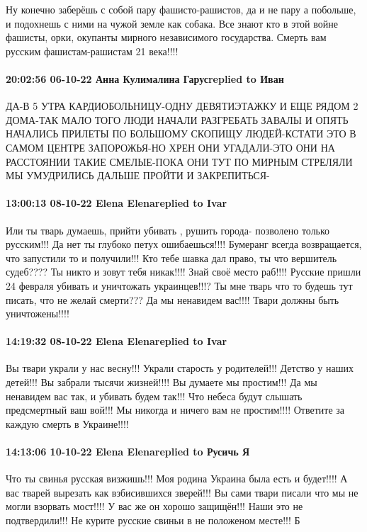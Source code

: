 Ну конечно заберёшь с собой пару фашисто-рашистов, да и не пару а побольше, и
подохнешь с ними на чужой земле как собака. Все знают кто в этой войне фашисты,
орки, окупанты мирного независимого государства. Смерть вам русским
фашистам-рашистам 21 века!!!!

\paragraph{20:02:56 06-10-22 Анна Кулималина Гарусreplied to Иван}

ДА-В 5 УТРА КАРДИОБОЛЬНИЦУ-ОДНУ ДЕВЯТИЭТАЖКУ И ЕЩЕ РЯДОМ 2 ДОМА-ТАК МАЛО ТОГО
ЛЮДИ НАЧАЛИ РАЗГРЕБАТЬ ЗАВАЛЫ И ОПЯТЬ НАЧАЛИСЬ ПРИЛЕТЫ ПО БОЛЬШОМУ СКОПИЩУ
ЛЮДЕЙ-КСТАТИ ЭТО В САМОМ ЦЕНТРЕ ЗАПОРОЖЬЯ-НО ХРЕН ОНИ УГАДАЛИ-ЭТО ОНИ НА
РАССТОЯНИИ ТАКИЕ СМЕЛЫЕ-ПОКА ОНИ ТУТ ПО МИРНЫМ СТРЕЛЯЛИ МЫ УМУДРИЛИСЬ ДАЛЬШЕ
ПРОЙТИ И ЗАКРЕПИТЬСЯ-

\paragraph{13:00:13 08-10-22 Elena Elenareplied to Ivar}

Или ты тварь думаешь, прийти убивать , рушить города- позволено только
русским!!! Да нет ты глубоко петух ошибаешься!!!! Бумеранг всегда возвращается,
что запустили то и получили!!! Кто тебе шавка дал право, ты что вершитель
судеб???? Ты никто и зовут тебя никак!!!! Знай своё место раб!!!! Русские
пришли 24 февраля убивать и уничтожать украинцев!!!? Ты мне тварь что то будешь
тут писать, что не желай смерти??? Да мы ненавидем вас!!!! Твари должны быть
уничтожены!!!!

\paragraph{14:19:32 08-10-22 Elena Elenareplied to Ivar}

Вы твари украли у нас весну!!! Украли старость у родителей!!! Детство у наших
детей!!! Вы забрали тысячи жизней!!!! Вы думаете мы простим!!! Да мы ненавидем
вас так, и убивать будем так!!! Что небеса будут слышать предсмертный ваш
вой!!! Мы никогда и ничего вам не простим!!!! Ответите за каждую смерть в
Украине!!!!

\paragraph{14:13:06 10-10-22 Elena Elenareplied to Русичь Я}

Что ты свинья русская визжишь!!! Моя родина Украина была есть и будет!!!! А вас
тварей вырезать как взбисившихся зверей!!! Вы сами твари писали что мы не могли
взорвать мост!!!! У вас же он хорошо защищён!!! Наши это не подтвердили!!! Не
курите русские свиньи в не положеном месте!!! Б

